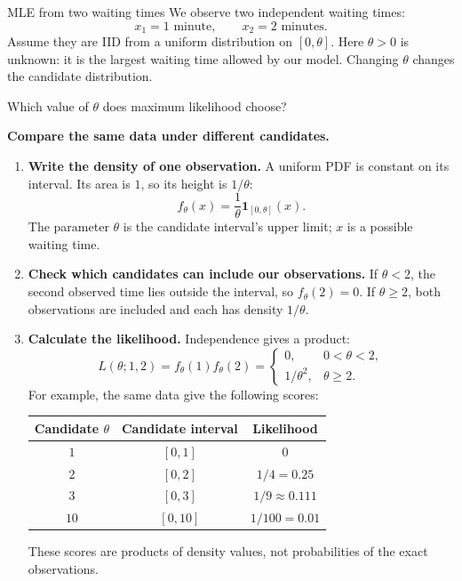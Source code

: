 \documentclass[a4paper,12pt,oneside]{report}
\begin{document}
\begin{framedexample}{MLE from two waiting times}
\label{ex:mle-two-waiting-times}
We observe two independent waiting times:
\[
  x_1=1\text{ minute},\qquad x_2=2\text{ minutes}.
\]
Assume they are IID from a uniform distribution on $[0,\theta]$.
Here $\theta>0$ is unknown: it is the largest waiting time allowed
by our model. Changing $\theta$ changes the candidate distribution.

Which value of $\theta$ does maximum likelihood choose?

\textbf{Compare the same data under different candidates.}
\begin{enumerate}[label=\textbf{Step \arabic*:},leftmargin=*]
  \item \textbf{Write the density of one observation.}
  A uniform PDF is constant on its interval. Its area is $1$, so
  its height is $1/\theta$:
  \[
    f_\theta(x)=\frac1\theta\mathbf1_{[0,\theta]}(x).
  \]
  The parameter $\theta$ is the candidate interval's upper limit;
  $x$ is a possible waiting time.

  \item \textbf{Check which candidates can include our observations.}
  If $\theta<2$, the second observed time lies outside the interval,
  so $f_\theta(2)=0$. If $\theta\geq2$, both observations are
  included and each has density $1/\theta$.

  \item \textbf{Calculate the likelihood.}
  Independence gives a product:
  \[
    L(\theta;1,2)=f_\theta(1)f_\theta(2)=
    \begin{cases}
      0,&0<\theta<2,\\[3pt]
      1/\theta^2,&\theta\geq2.
    \end{cases}
  \]
  For example, the same data give the following scores:
  \begin{center}
  \begin{tabular}{@{}ccc@{}}
    \toprule
    Candidate $\theta$ & Candidate interval & Likelihood\\
    \midrule
    $1$ & $[0,1]$ & $0$\\
    $2$ & $[0,2]$ & $1/4=0.25$\\
    $3$ & $[0,3]$ & $1/9\approx0.111$\\
    $10$ & $[0,10]$ & $1/100=0.01$\\
    \bottomrule
  \end{tabular}
  \end{center}
  These scores are products of density values, not probabilities
  of the exact observations.


\end{enumerate}
\end{framedexample}
\end{document}
